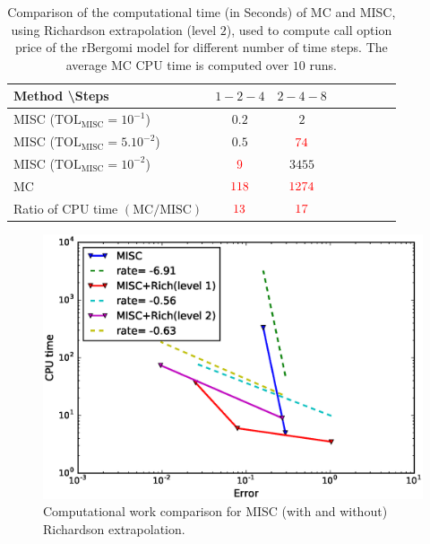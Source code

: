 \begin{table}[!h]
	\centering
	\begin{tabular}{l*{6}{c}r}
		Method \textbackslash  Steps            & $1-2-4$ & $2-4-8$   \\
		\hline

		MISC ($\text{TOL}_{\text{MISC}}=10^{-1}$)  & $0.2$ & $2$ &   \\
		MISC ($\text{TOL}_{\text{MISC}}=5.10^{-2}$)  & $0.5$ & ${\color{red}74}$  \\
		MISC ($\text{TOL}_{\text{MISC}}=10^{-2}$)  & ${\color{red}9}$ & $3455$   \\
		\hline
		MC    & $ {\color{red}  118}$  & ${\color{red}1274}$  \\
		
		\hline
		Ratio of CPU time $\left(\text{MC}/ \text{MISC} \right)$  &${\color{red}13}$ & ${\color{red}  17}$   \\
		\hline
	\end{tabular}
	\caption{Comparison of the computational time (in Seconds) of  MC and MISC, using Richardson extrapolation (level $2$), used to compute call option price of the rBergomi model for different number of time steps. The
		average MC CPU time is computed over $10$ runs.}
	\label{Comparsion of the computational time of  MC and MISC, using Richardson extrapolation (level $2$), used to compute Call option price of rBergomi model for different number of time steps. Case set $2$ parameters,linear}
\end{table}

\FloatBarrier

\begin{figure}[h!]
	\centering
	\includegraphics[width=0.5\linewidth]{./figures/rBergomi_Complexity_rates/set2/error_vs_time_set2_comparison_linear}
	
	\caption{Computational work comparison for  MISC (with and without) Richardson extrapolation.}
	\label{fig:Complexity plot for  MISC for Case set $2$ parameters, comparison}
\end{figure}




